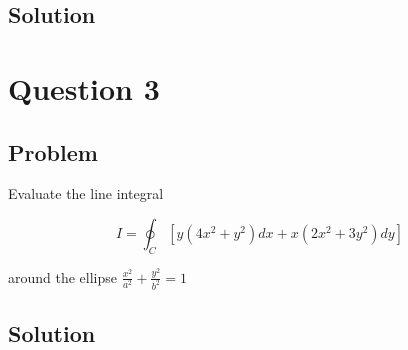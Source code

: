 \documentclass[12pt]{article}
\begin{document}
\subsection{Solution}



\newpage
\section{Question 3}

\subsection{Problem}

Evaluate the line integral

\[
    I=\oint_C\left[y\left(4 x^2+y^2\right) d x+x\left(2 x^2+3 y^2\right) d y\right]
\]

around the ellipse \(\frac{x^2}{a^2}+\frac{y^2}{b^2}=1\)

\subsection{Solution}



\newpage


\nocite{El-Deeb_PEU-218_Assignments}
\end{document}
